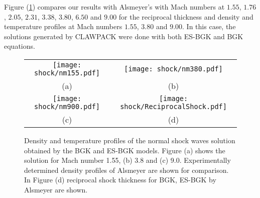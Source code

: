 
Figure (\ref{figShock}) compares our results with Alsmeyer's with Mach numbers at $1.55$, $1.76$, $2.05$, $2.31$, $3.38$, $3.80$, $6.50$ and $9.00$ for the reciprocal thickness and density and temperature profiles at Mach numbers $1.55$, $3.80$ and $9.00$. In this case, the solutions generated by CLAWPACK were done with both ES-BGK and BGK equations.
%
\begin{figure}[htb]
  \begin{tabular}{cc}
  \texttt{[image: shock/nm155.pdf]}&
  \texttt{[image: shock/nm380.pdf]}\\
  {\small (a) }& {\small (b) }\\
  \texttt{[image: shock/nm900.pdf]}& 
  \texttt{[image: shock/ReciprocalShock.pdf]}\\
  {\small (c) }& {\small (d) }\\
  \end{tabular}
  \caption{\label{figShock} Density and temperature profiles of the normal shock waves solution obtained by the BGK and ES-BGK models. Figure (a) shows the solution for Mach number 1.55, (b) 3.8 and (c) 9.0. Experimentally determined density profiles of Alsmeyer \cite{alsmeyer} are shown for comparison. In Figure (d) reciprocal shock thickness for BGK, ES-BGK by Alsmeyer are shown.}
\end{figure}
%

